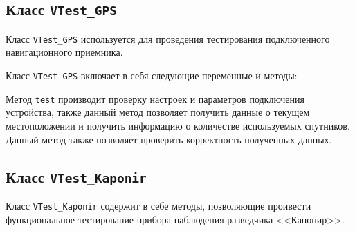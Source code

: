 \subsection{Класс \texttt{VTest\_GPS}}
Класс \texttt{VTest\_GPS} используется для проведения тестирования подключенного навигационного приемника.

Класс \texttt{VTest\_GPS} включает в себя следующие переменные и методы:
\begin{enum}
	\item Метод \texttt{test} производит проверку настроек и параметров подключения устройства, также данный метод
		позволяет получить данные о текущем местоположении и получить информацию о количестве используемых
		спутников. Данный метод также позволяет проверить корректность полученных данных.
\end{enum}


\subsection{Класс \texttt{VTest\_Kaponir}}
Класс \texttt{VTest\_Kaponir} содержит в себе методы, позволяющие проивести функциональное тестирование прибора
наблюдения разведчика <<Капонир>>.

